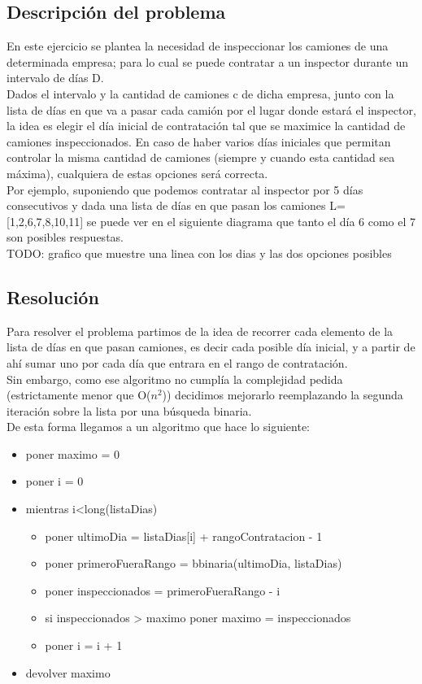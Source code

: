 \subsection{Descripci\'on del problema}

En este ejercicio se plantea la necesidad de inspeccionar los camiones de una determinada empresa; para lo cual se puede contratar a un inspector durante un intervalo de d\'ias D. \\ 
Dados el intervalo y la cantidad de camiones c de dicha empresa, junto con la lista de d\'ias en que va a pasar cada cami\'on por el lugar donde estar\'a el inspector, la idea es elegir el d\'ia inicial de contrataci\'on tal que se maximice la cantidad de camiones inspeccionados. En caso de haber varios d\'ias iniciales que permitan controlar la misma cantidad de camiones (siempre y cuando esta cantidad sea m\'axima), cualquiera de estas opciones ser\'a correcta. \\

Por ejemplo, suponiendo que podemos contratar al inspector por 5 d\'ias consecutivos y dada una lista de d\'ias en que pasan los camiones L=[1,2,6,7,8,10,11] se puede ver en el siguiente diagrama que tanto el d\'ia 6 como el 7 son posibles respuestas.\\

TODO: grafico que muestre una linea con los dias y las dos opciones posibles

\subsection{Resoluci\'on}

Para resolver el problema partimos de la idea de recorrer cada elemento de la lista de d\'ias en que pasan camiones, es decir cada posible d\'ia inicial, y a partir de ah\'i sumar uno por cada d\'ia que entrara en el rango de contrataci\'on.\\
Sin embargo, como ese algoritmo no cumpl\'ia la complejidad pedida (estrictamente menor que O($n^2$)) decidimos mejorarlo reemplazando la segunda iteraci\'on sobre la lista por una b\'usqueda binaria.\\
De esta forma llegamos a un algoritmo que hace lo siguiente:
\begin{itemize}
\item poner maximo = 0
\item poner i = 0
\item mientras i<long(listaDias)
\begin{itemize}
	\item poner ultimoDia = listaDias[i] + rangoContratacion - 1
	\item poner primeroFueraRango = bbinaria(ultimoDia, listaDias)
	\item poner inspeccionados = primeroFueraRango - i
	\item si inspeccionados > maximo poner maximo = inspeccionados
	\item poner i = i + 1
\end{itemize}
\item devolver maximo
\end{itemize}

